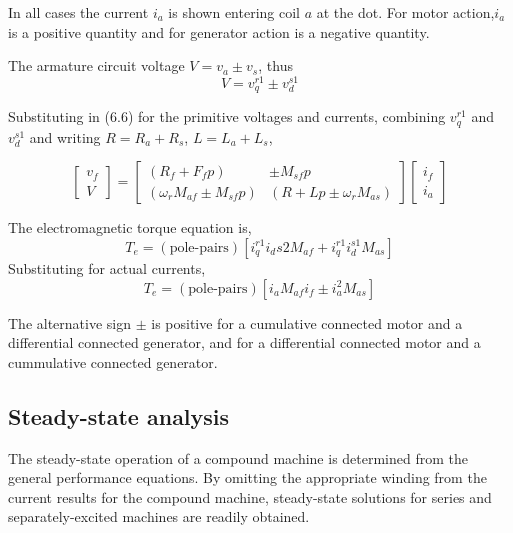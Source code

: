 \documentclass[a4paper,numbers=noenddot,12pt]{scrbook}
\begin{document}
In all cases the current $i_a$ is shown entering coil $a$ at the dot. For motor action,$i_a$ is a positive quantity and for generator action is a negative quantity.

The armature circuit voltage $V=v_a\pm v_s$, thus
\begin{equation*}
    V=v_q^{r1} \pm v_d^{s1}
    \label{}
\end{equation*}

Substituting in (6.6) for the primitive voltages and currents, combining $v_q^{r1}$ and $v_d^{s1}$ and writing $R = R_a + R_s$, $L = L_a + L_s$,

\begin{equation}
    \begin{bmatrix}
        v_f \\[2ex] V
    \end{bmatrix} =
    \begin{bmatrix}
        (R_f +F_f p) & \pm M_{sf} p \\[2ex]
        (\omega_r M_{af} \pm M_{sf} p) & (R + L p \pm \omega_r M_{as})
    \end{bmatrix}
    \begin{bmatrix}
        i_f \\[2ex] i_a
    \end{bmatrix}
    \label{}
\end{equation}

The electromagnetic torque equation is,
\begin{equation*}
    T_e = (\text{pole-pairs})[i_q^{r1} i_d{s2} M_{af} + i_q^{r1} i_d^{s1} M_{as}]
\end{equation*}
Substituting for actual currents,
\begin{equation}
    T_e = (\text{pole-pairs})[i_a M_{af} i_f \pm i_a^{2} M_{as}]
    \label{}
\end{equation}

The alternative sign $\pm$ is positive for a cumulative connected motor and a differential connected generator, and for a differential connected motor and a cummulative connected generator.

\subsection{Steady-state analysis}
The steady-state operation of a compound machine is determined from the general performance equations. By omitting the appropriate winding from the current results for the compound machine, steady-state solutions for series and separately-excited machines are readily obtained.
\end{document}
